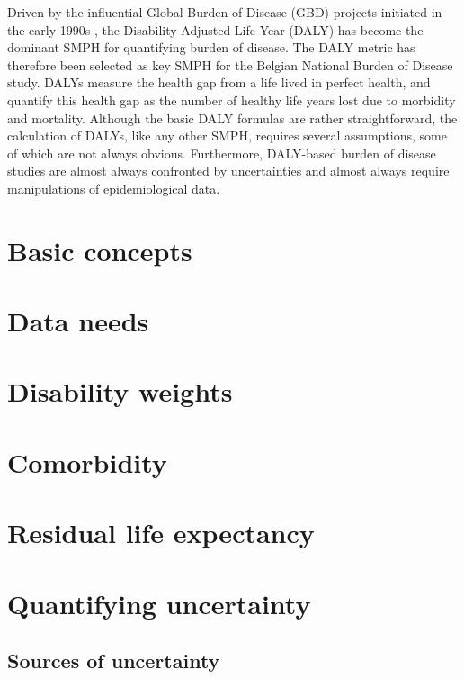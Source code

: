\documentclass[]{book}
\begin{document}
Driven by the influential Global Burden of Disease (GBD) projects
initiated in the early 1990s \citep{murray1996global}, the
Disability-Adjusted Life Year (DALY) has become the dominant SMPH for
quantifying burden of disease. The DALY metric has therefore been
selected as key SMPH for the Belgian National Burden of Disease study.
DALYs measure the health gap from a life lived in perfect health, and
quantify this health gap as the number of healthy life years lost due to
morbidity and mortality. Although the basic DALY formulas are rather
straightforward, the calculation of DALYs, like any other SMPH, requires
several assumptions, some of which are not always obvious. Furthermore,
DALY-based burden of disease studies are almost always confronted by
uncertainties and almost always require manipulations of epidemiological
data.

\chapter{Basic concepts}\label{basic-concepts}

\chapter{Data needs}\label{data-needs}

\chapter{Disability weights}\label{disability-weights}

\chapter{Comorbidity}\label{comorbidity}

\chapter{Residual life expectancy}\label{residual-life-expectancy}

\chapter{Quantifying uncertainty}\label{quantifying-uncertainty}

\section{Sources of uncertainty}\label{sources-of-uncertainty}
\end{document}
